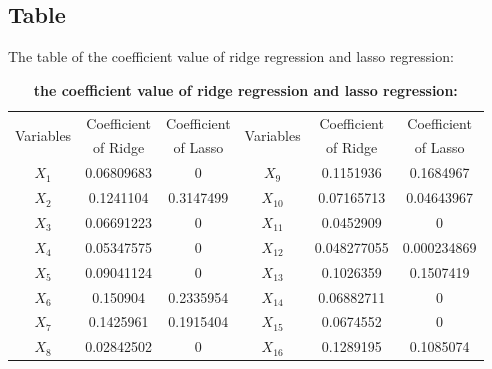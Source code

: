 \subsection{Table}
The table of the coefficient value of ridge regression and lasso regression:\par
\begin{table}[H]
\caption{\textbf{the coefficient value of ridge regression and lasso regression:}}
\centering
\begin{tabular}{@{}cccccc@{}}
\toprule
\multirow{2}{*}{Variables} & Coefficient  & Coefficient & \multirow{2}{*}{Variables} & Coefficient & Coefficient  \\ 
& of Ridge     & of Lasso & & of Ridge & of Lasso \\
\midrule
$X_1$      & 0.06809683           & 0                    & $X_9$        & 0.1151936            & 0.1684967            \\
$X_2$        & 0.1241104            & 0.3147499            & $X_{10}$       & 0.07165713           & 0.04643967           \\
$X_3$        & 0.06691223          & 0                    & $X_{11}$       & 0.0452909            & 0                    \\
$X_4$        & 0.05347575           & 0                    & $X_{12}$       & 0.048277055          & 0.000234869          \\
$X_5$        & 0.09041124           & 0                    & $X_{13}$       & 0.1026359            & 0.1507419            \\
$X_6$        & 0.150904             & 0.2335954            & $X_{14}$       & 0.06882711           & 0                    \\
$X_7$        & 0.1425961            & 0.1915404            & $X_{15}$       & 0.0674552            & 0                    \\
$X_8$        & 0.02842502           & 0                    & $X_{16}$       & 0.1289195            & 0.1085074  \\       
\bottomrule
\end{tabular}
\end{table}
